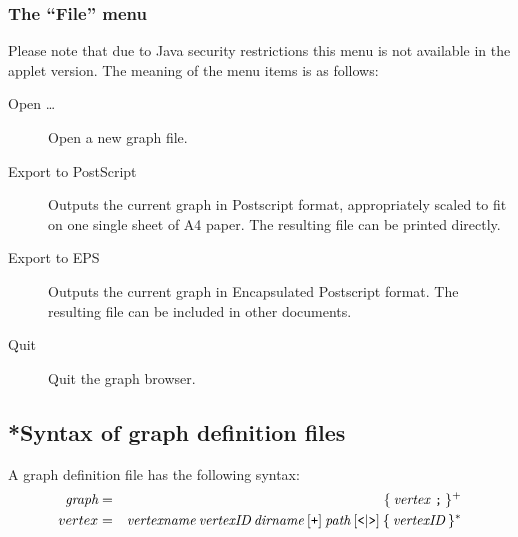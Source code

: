 \subsubsection*{The ``File'' menu}

Please note that due to Java security restrictions this menu is not
available in the applet version. The meaning of the menu items is as
follows:
\begin{description}
  
\item[Open \dots] Open a new graph file.
  
\item[Export to PostScript] Outputs the current graph in Postscript format,
  appropriately scaled to fit on one single sheet of A4 paper.  The resulting
  file can be printed directly.
  
\item[Export to EPS] Outputs the current graph in Encapsulated Postscript
  format. The resulting file can be included in other documents.

\item[Quit] Quit the graph browser.

\end{description}


\subsection*{*Syntax of graph definition files}

A graph definition file has the following syntax:
\begin{eqnarray*}
  \mbox{\it graph} & = & \{ \: \mbox{\it vertex \tt ;} \: \} ^ + \\
  vertex & = & \mbox{\it vertexname} \: \mbox{\it vertexID} \: \mbox{\it dirname} \: [ \mbox{\tt +} ]
  \: \mbox{\it path} \: [ \mbox{\tt <} | \mbox{\tt >} ] \: \{ \: \mbox{\it vertexID} \: \} ^ *
\end{eqnarray*}

